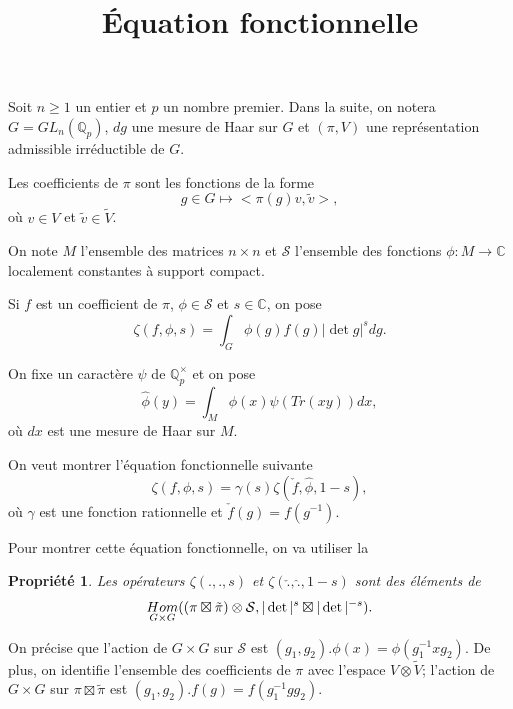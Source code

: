 \documentclass{amsart}
\newtheorem{propriete}{Propriété}
\DeclareMathOperator{\Hom}{\mathnormal{Hom}}
\begin{document}
\title{Équation fonctionnelle}
\maketitle

%
%

Soit $n \geq 1$ un entier et $p$ un nombre premier. Dans la suite, on notera $G = GL_n(\mathbb{Q}_p)$, $dg$ une mesure de Haar sur $G$ et $(\pi, V)$ une représentation admissible irréductible de $G$.

Les coefficients de $\pi$ sont les fonctions de la forme
$$g \in G \mapsto <\pi(g)v, \tilde{v}>,$$
où $v \in V$ et $\tilde{v} \in \tilde{V}$.

On note $M$ l'ensemble des matrices $n \times n$ et $\mathcal{S}$ l'ensemble des fonctions $\phi : M \rightarrow \mathbb{C}$ localement constantes à support compact.

Si $f$ est un coefficient de $\pi$, $\phi \in \mathcal{S}$ et $s \in \mathbb{C}$, on pose
$$\zeta(f, \phi, s) = \int_G \phi(g)f(g)|\det g|^s dg.$$

On fixe un caractère $\psi$ de $\mathbb{Q}_p^\times$ et on pose
$$\hat{\phi}(y) = \int_M \phi(x) \psi(Tr(xy)) dx,$$
où $dx$ est une mesure de Haar sur $M$.

On veut montrer l'équation fonctionnelle suivante
$$\zeta(f, \phi, s) = \gamma(s) \zeta(\check{f}, \hat{\phi}, 1-s),$$
où $\gamma$ est une fonction rationnelle et $\check{f}(g) = f(g^{-1})$.

Pour montrer cette équation fonctionnelle, on va utiliser la
\begin{propriete}
Les opérateurs $\zeta(., ., s)$ et $\zeta(\check{.}, \hat{.}, 1-s)$ sont des éléments de
$$\Hom_{G \times G} ( (\pi \boxtimes \tilde{\pi}) \otimes \mathcal{S}, |\det|^s \boxtimes |\det|^{-s}).$$
\end{propriete}

On précise que l'action de $G \times G$ sur $\mathcal{S}$ est
$(g_1,g_2).\phi(x) = \phi(g_1^{-1} x g_2)$. De plus, on identifie l'ensemble des coefficients de $\pi$ avec l'espace $V\otimes \tilde{V}$; l'action de $G \times G$ sur $\pi \boxtimes \tilde{\pi}$ est $(g_1,g_2).f(g) = f(g_1^{-1} g g_2)$.
\end{document}
